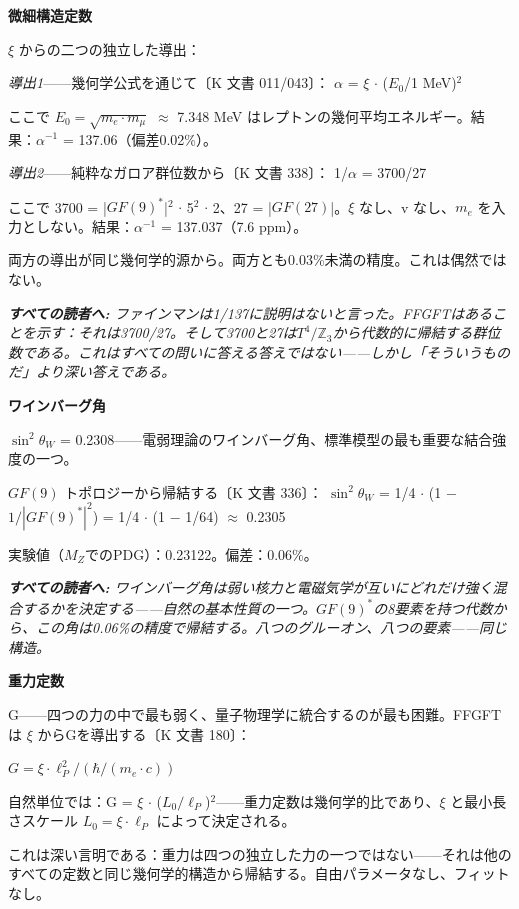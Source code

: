 \documentclass[11pt,openany]{book}
\newenvironment{laierspur}{%
  \par\vspace{4pt}%
  \noindent\small\itshape\color{blue!60!black}%
  \textbf{すべての読者へ:}\enspace\ignorespaces}{%
  \par\vspace{4pt}\normalsize\normalfont\normalcolor}
\begin{document}
\textbf{微細構造定数}

$\xi$ からの二つの独立した導出：

\textit{導出1}——幾何学公式を通じて〔K 文書 011/043〕：
$\alpha$ = $\xi$ $\cdot$ ($E_0$/1 MeV)$^2$

ここで $E_0 = \sqrt{m_e\cdot m_\mu}$ $\approx$ 7.348 MeV はレプトンの幾何平均エネルギー。結果：$\alpha^{-1}$ = 137.06（偏差0.02\%）。

\textit{導出2}——純粋なガロア群位数から〔K 文書 338〕：
1/$\alpha$ = 3700/27

ここで 3700 = |$GF(9)^*$|$^2$ $\cdot$ 5$^2$ $\cdot$ 2、27 = |$GF(27)$|。$\xi$ なし、v なし、$m_e$ を入力としない。結果：$\alpha^{-1}$ = 137.037（7.6 ppm）。

両方の導出が同じ幾何学的源から。両方とも0.03\%未満の精度。これは偶然ではない。

\begin{laierspur}
ファインマンは1/137に説明はないと言った。FFGFTはあることを示す：それは3700/27。そして3700と27は$T^4/\mathbb{Z}_3$から代数的に帰結する群位数である。これはすべての問いに答える答えではない——しかし「そういうものだ」より深い答えである。
\end{laierspur}

\textbf{ワインバーグ角}

$\sin^2\theta_W$ = 0.2308——電弱理論のワインバーグ角、標準模型の最も重要な結合強度の一つ。

$GF(9)$ トポロジーから帰結する〔K 文書 336〕：
$\sin^2\theta_W$ = 1/4 $\cdot$ (1 $-$ $1/|GF(9)^*|^2$) = 1/4 $\cdot$ (1 $-$ 1/64) $\approx$ 0.2305

実験値（$M_Z$でのPDG）：0.23122。偏差：0.06\%。

\begin{laierspur}
ワインバーグ角は弱い核力と電磁気学が互いにどれだけ強く混合するかを決定する——自然の基本性質の一つ。$GF(9)^*$の8要素を持つ代数から、この角は0.06\%の精度で帰結する。八つのグルーオン、八つの要素——同じ構造。
\end{laierspur}

\textbf{重力定数}

G——四つの力の中で最も弱く、量子物理学に統合するのが最も困難。FFGFTは $\xi$ からGを導出する〔K 文書 180〕：

$G = \xi\cdot\ell_P^2/(\hbar/(m_e\cdot c))$

自然単位では：G = $\xi$ $\cdot$ ($L_0/\ell_P$)$^2$——重力定数は幾何学的比であり、$\xi$ と最小長さスケール $L_0 = \xi \cdot \ell_P$ によって決定される。

これは深い言明である：重力は四つの独立した力の一つではない——それは他のすべての定数と同じ幾何学的構造から帰結する。自由パラメータなし、フィットなし。
\end{document}

